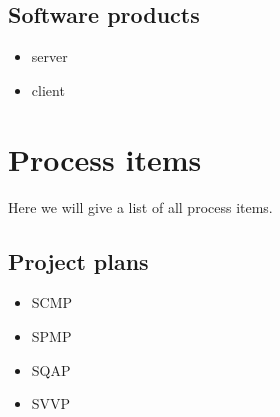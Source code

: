 \subsection {Software products}
\begin{itemize}
\item \projectname{} server
\item \projectname{} client
\end{itemize}

\section{Process items}
\label{sec:procItems}

Here we will give a list of all process items.

\subsection{Project plans}
\begin{itemize}
\item SCMP \cite{scmp}
\item SPMP \cite{spmp}
\item SQAP \cite{sqap}
\item SVVP \cite{svvp}
\end{itemize}

